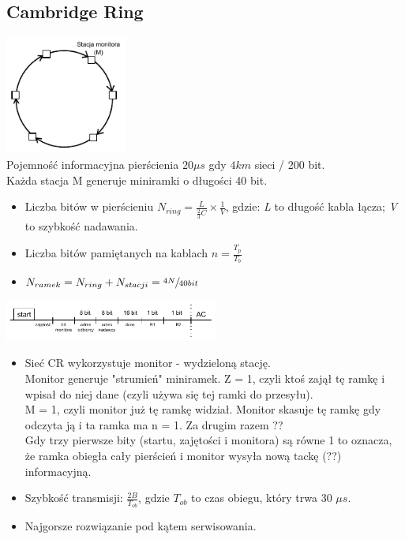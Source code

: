 \documentclass[a4paper,twoside]{article}
\begin{document}
		\subsection{Cambridge Ring}
			\includegraphics[width=4cm]{./images/image32.pdf}\\
			Pojemność informacyjna pierścienia $ 20\mu{s} $ gdy $ 4km $ sieci / 200 bit.\\
			Każda stacja M generuje miniramki o długości 40 bit.\\
			\begin{itemize}
				\item Liczba bitów w pierścieniu $ N_{ring}=\frac{L}{\frac{2}{3}C}\times \frac{1}{V}$, gdzie: \emph{L} to długość kabla łącza; \emph{V} to szybkość nadawania.
				\item Liczba bitów pamiętanych na kablach $ n=\frac{T_p}{T_b} $
				\item $ N_{ramek}=N_{ring}+N_{stacji}=\sfrac{4N}{40bit}$
			\end{itemize}
			\includegraphics[width=7cm]{./images/image33.pdf}
			\begin{itemize}
				\item Sieć CR wykorzystuje monitor - wydzieloną stację.\\
				Monitor generuje "strumień" miniramek. Z = 1, czyli ktoś zajął tę ramkę i wpisał do niej dane (czyli używa się tej ramki do przesyłu).\\
				M = 1, czyli monitor już tę ramkę widział. Monitor skasuje tę ramkę gdy odczyta ją i ta ramka ma n = 1. Za drugim razem ??\\
				Gdy trzy pierwsze bity (startu, zajętości i monitora) są równe 1 to oznacza, że ramka obiegła cały pierścień i monitor wysyła nową tackę (??) informacyjną.
				\item Szybkość transmisji: $ \frac{2B}{T_{ob}} $, gdzie $ T_{ob} $ to czas obiegu, który trwa 30 $ \mu s $.
				\item Najgorsze rozwiązanie pod kątem serwisowania.
			\end{itemize}
\end{document}
